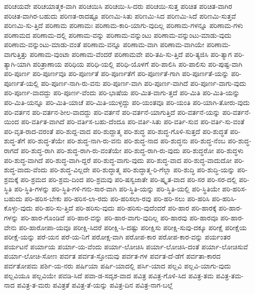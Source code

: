 {ಪರಿಚಯವೇ
ಪರಿಚಯಾತ್ಮಕ-ವಾಗಿ
ಪರಿಚಯಿಸಿ
ಪರಿಚಯಿ-ಸಿ-ದರು
ಪರಿಚಯಿ-ಸುತ್ತ
ಪರಿಚಿತ
ಪರಿಚಿತ-ವಾಗಿರ
ಪರಿಚಿತ-ವಾಗಿರ-ಬಹುದು
ಪರಿಣತ-ರಾದಷ್ಟೂ
ಪರಿಣಮಿ-ಸಿತು
ಪರಿಣಮಿ-ಸಿದ
ಪರಿಣಮಿ-ಸಿದೆ
ಪರಿಣಮಿ-ಸುತ್ತವೆ
ಪರಿಣಮಿ-ಸು-ತ್ತಿದೆ
ಪರಿಣಾಮ
ಪರಿಣಾಮಃ
ಪರಿಣಾಮ-ಕಾರಿ-ಯಾಗು-ವುದಿಲ್ಲ
ಪರಿಣಾಮ-ಗಳನ್ನೂ
ಪರಿಣಾಮ-ಗಳು
ಪರಿಣಾಮದ
ಪರಿಣಾಮ-ದಲ್ಲಿ
ಪರಿಣಾಮ-ವನ್ನು
ಪರಿಣಾಮ-ವನ್ನುಂಟು
ಪರಿಣಾಮ-ವನ್ನುಂಟು-ಮಾಡು-ವುದು
ಪರಿಣಾಮ-ವನ್ನುಂಟು-ಮಾಡು-ವಂತೆ
ಪರಿಣಾಮ-ವನ್ನೂ
ಪರಿಣಾಮ-ವಾಗಿ
ಪರಿಣಾಮ-ವಾಗಿಯೇ
ಪರಿಣಾಮ-ವಾಗುತ್ತಿತ್ತು
ಪರಿಣಾಮ-ವುಂಟಾ
ಪರಿಣಾಮ-ವೆಂದರೆ
ಪರಿಣಾಮವೇ
ಪರಿ-ತಪಿ-ಸು-ತ್ತಿದೆ
ಪರಿ-ತ್ಯಜಿಸಿ
ಪರಿ-ತ್ಯಾಗ
ಪರಿ-ತ್ಯಾಗಿ-ಯಾಗಿ
ಪರಿತ್ರಾಣಾಯ
ಪರಿಧಿಯ
ಪರಿಧಿ-ಯಲ್ಲಿ
ಪರಿಧಿ-ಯೊಳಗೆ
ಪರಿ-ಪಾಲಿಸಿ
ಪರಿ-ಪಾಲಿಸು
ಪರಿ-ಪುಷ್ಟ-ವಾಗಿ
ಪರಿ-ಪೂರ್ಣ
ಪರಿ-ಪೂರ್ಣವೂ
ಪರಿ-ಪೂರ್ಣತೆ
ಪರಿ-ಪೂರ್ಣತೆಗೆ
ಪರಿ-ಪೂರ್ಣತೆ-ಗಾಗಿ
ಪರಿ-ಪೂರ್ಣತೆ-ಯನ್ನು
ಪರಿ-ಪೂರ್ಣತೆ-ಯಲ್ಲಿ
ಪರಿ-ಪೂರ್ಣ-ನಾಗಿ-ರು-ವನು
ಪರಿ-ಪೂರ್ಣ-ವಾಗಿ
ಪರಿ-ಪೂರ್ಣ-ವಾಗಿದೆ
ಪರಿ-ಪೂರ್ಣ-ವಾಗು-ವುದು
ಪರಿ-ಪೂರ್ಣ-ವಾದದ್ದು
ಪರಿ-ಪೂರ್ಣ-ವೆಂದು
ಪರಿ-ಭಾಷೆಯ
ಪರಿ-ಮಿತ-ವಾಗು-ತ್ತದೆ
ಪರಿ-ಮಿತಿ
ಪರಿ-ಮಿತಿ-ಯನ್ನು
ಪರಿ-ಮಿತಿ-ಯನ್ನೂ
ಪರಿ-ಮಿತಿ-ಯಾಚೆ
ಪರಿ-ಮಿತಿ-ಯುಳ್ಳದ್ದು
ಪರಿ-ಯಂತವೂ
ಪರಿ-ಯಂತಿ
ಪರಿ-ಯಾಗಿ-ತೋರು-ವುದು
ಪರಿ-ವರ್ತನ
ಪರಿ-ವರ್ತನ-ಶೀಲ-ವಾದದ್ದು
ಪರಿ-ವರ್ತನೆ
ಪರಿ-ವರ್ತನೆ-ಯಾಗುತ್ತಿದೆ
ಪರಿ-ವರ್ತನೆ-ಯನ್ನು
ಪರಿ-ವರ್ತನೆ-ಯಿಂದ
ಪರಿ-ವರ್ತಿತ-ವಾಗಿದೆ
ಪರಿ-ವರ್ತಿಸ-ಬಹು-ದೆಂದೂ
ಪರಿ-ವರ್ತಿ-ಸಿತು
ಪರಿ-ವರ್ತಿ-ಸುವ
ಪರಿ-ವರ್ತಿ-ಸು-ವಂತೆ
ಪರಿ-ವೃತ-ರಾದ-ವರಂತೆ
ಪರಿ-ಶುದ್ದ-ವಾದ
ಪರಿ-ಶುದ್ದಾತ್ಮ
ಪರಿ-ಶುದ್ಧ
ಪರಿ-ಶುದ್ಧ-ಗೊಳಿ-ಸುತ್ತದೆ
ಪರಿ-ಶುದ್ಧತೆ
ಪರಿ-ಶುದ್ಧ-ತೆಗೆ
ಪರಿ-ಶುದ್ಧ-ತೆಯೇ
ಪರಿ-ಶುದ್ಧ-ನಾಗಿ-ರು-ವನು
ಪರಿ-ಶುದ್ಧ-ನಾದ
ಪರಿ-ಶುದ್ಧನು
ಪರಿ-ಶುದ್ಧ-ನೆಂಬ
ಪರಿ-ಶುದ್ಧ-ರಾಗದೆ
ಪರಿ-ಶುದ್ಧ-ರಾಗಿ
ಪರಿ-ಶುದ್ಧ-ರಾಗಿ-ರು-ವಂತೆಯೇ
ಪರಿ-ಶುದ್ಧ-ರಾಗಿ-ರು-ವುದು
ಪರಿ-ಶುದ್ಧರೋ
ಪರಿ-ಶುದ್ಧಳು
ಪರಿ-ಶುದ್ಧ-ವಾಗಿದೆ
ಪರಿ-ಶುದ್ಧ-ವಾಗಿ-ದ್ದರೆ
ಪರಿ-ಶುದ್ಧ-ವಾಗು-ವುದು
ಪರಿ-ಶುದ್ಧ-ವಾದ
ಪರಿ-ಶುದ್ಧ-ವಾದುದೋ
ಪರಿ-ಶುದ್ಧ-ವಾದು-ವೆಂದು
ಪರಿ-ಶುದ್ಧ-ವಿಲ್ಲದೇ
ಪರಿ-ಶುದ್ಧಾತ್ಮ
ಪರಿ-ಶುದ್ಧಾತ್ಮ-ರಿ-ಗೆಲ್ಲಾ
ಪರಿ-ಶುದ್ಧಿ
ಪರಿ-ಶುದ್ಧಿ-ಯನ್ನು
ಪರಿ-ಶ್ರಮಕ್ಕೆ
ಪರಿ-ಶ್ರಮದ
ಪರಿ-ಶ್ರಮ-ದಿಂದ
ಪರಿ-ಶ್ರಮವು
ಪರಿ-ಷಸ್ವಜಾತೇ
ಪರಿ-ಷ್ಕೃತ-ವಾದ
ಪರಿ-ಸರ
ಪರಿ-ಸರ-ದಲ್ಲಿ
ಪರಿ-ಸ್ಥಿತಿ
ಪರಿ-ಸ್ಥಿತಿ-ಗಳನ್ನು
ಪರಿ-ಸ್ಥಿತಿ-ಗಳಿ-ಗನು-ಸಾರ-ವಾಗಿ
ಪರಿ-ಸ್ಥಿತಿ-ಯನ್ನು
ಪರಿ-ಸ್ಥಿತಿ-ಯಲ್ಲಿ
ಪರಿ-ಸ್ಥಿತಿಯೇ
ಪರಿ-ಹರಿಸ-ಬಹುದು
ಪರಿ-ಹರಿಸ-ಬೇಕು
ಪರಿ-ಹರಿಸ-ಲಾ-ರದು
ಪರಿ-ಹರಿಸಲಾ-ರವು
ಪರಿ-ಹರಿ-ಸಲು
ಪರಿ-ಹರಿಸಿ
ಪರಿ-ಹರಿಸಿ-ಕೊಳ್ಳು-ವುದು
ಪರಿ-ಹರಿ-ಸು-ತ್ತಿದೆ
ಪರಿ-ಹರಿಸು-ವುದು
ಪರಿ-ಹರಿಸು-ವುದೆಂದರೆ
ಪರಿ-ಹಾರ
ಪರಿ-ಹಾರಕ್ಕೆ
ಪರಿ-ಹಾರ-ಗಳನ್ನು
ಪರಿ-ಹಾರ-ಗೊಂಡಿವೆ
ಪರಿ-ಹಾರ-ವನ್ನು
ಪರಿ-ಹಾರ-ವಾಗು-ವುದಿಲ್ಲ
ಪರಿ-ಹಾರವು
ಪರಿ-ಹಾರವೂ
ಪರಿ-ಹಾರ-ವೇನು
ಪರಿ-ಹಾರೋಪಾ-ಯವೂ
ಪರೀಕ್ಷಿ-ಸಿದರೆ
ಪರೀಕ್ಷಿ-ಸಿ-ದಷ್ಟು
ಪರೀಕ್ಷಿಸು
ಪರೀಕ್ಷಿ-ಸುವು-ದಕ್ಕೂ
ಪರೀಕ್ಷೆ
ಪರೀಕ್ಷೆಯ
ಪರೀಕ್ಷೆ-ಯನ್ನು
ಪರೆ-ಯನ
ಪರೆ-ಯ-ನಿಗೆ
ಪರೋಕ್ಷ-ವಾಗಿ
ಪರೋಪ-ಕಾರ
ಪರೋಪ-ಕಾರ-ವನ್ನು
ಪರ್ಯಂತರ
ಪರ್ಯಟನೆ
ಪರ್ಯಾಯ
ಪರ್ಯಾ-ಯ-ವೆಂದು
ಪರ್ಯಾ-ಲೋಚಿಸಿ
ಪರ್ಯಾ-ಲೋಚಿಸಿ-ದಂತೆ
ಪರ್ಯಾ-ಲೋಚಿಸುವೆ
ಪರ್ಯಾ-ಲೋಚಿ-ಸೋಣ
ಪರ್ವತ
ಪರ್ವತ-ಸ್ತೋಮವು
ಪರ್ವತ-ಗಳ
ಪರ್ವತ-ದೆ-ಡೆಗೆ
ಪರ್ವತಾ-ಕಾರದ
ಪರ್ವತೋಪಮ
ಪರ್ಶಿ-ಯ-ನರು
ಪರ್ಷಿಯಾ
ಪರ್ಷಿ-ಯಾದಲ್ಲಿ
ಪರ್ಸಿ-ಯಾದ
ಪಲ್ಲವಿ
ಪಲ್ಲವಿ-ಯಾಗು-ವುದು
ಪಲ್ಲವಿಯೂ
ಪಲ್ಲವಿಯೇ
ಪವಡಿ-ಸಿದೆ
ಪವಾ-ಡ-ಸದೃಶ-ವಾದ
ಪವಿತ್ರ
ಪವಿತ್ರ-ಗೊಳಿ-ಸಿದ
ಪವಿತ್ರ-ತಮ
ಪವಿತ್ರ-ತಮ-ನಾದ
ಪವಿತ್ರ-ತ-ಮರು
ಪವಿತ್ರತೆ
ಪವಿತ್ರ-ತೆ-ಯನ್ನು
ಪವಿತ್ರ-ದಿನ
ಪವಿತ್ರ-ನಾಗ-ಬಲ್ಲೆ
}
